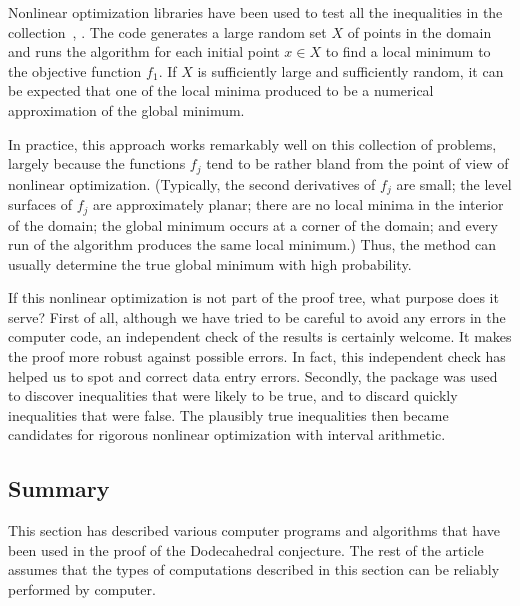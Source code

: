 \documentclass{article} %
\begin{document}
Nonlinear optimization libraries have been used to test
all the inequalities in the collection~\cite{Lawrence:1997:CFSQP},
\cite{Byrd:2006:LSNO}. 
The code generates a large random set
$X$ of points in the domain and runs the algorithm for each initial
point $x\in X$ to find a local minimum to the objective function
$f_1$. If $X$ is sufficiently large and sufficiently random, it can be
expected that one of the local minima produced to be a numerical
approximation of the global minimum.

In practice, this approach works remarkably well on this
collection of problems, largely because the functions $f_j$
tend to be rather bland from the point of view of nonlinear
optimization.  (Typically, the second derivatives of $f_j$
are small; the level surfaces of $f_j$ are approximately planar;
there are no local minima in the interior of the domain;
the global minimum occurs at a corner of the domain; and
every run of the algorithm produces the same local minimum.)
Thus, the method can usually determine the true global minimum with
high probability.

If this nonlinear optimization is not part of the proof tree, what
purpose does it serve? First of all, although we have tried to be
careful to avoid any errors in the computer code, an independent check
of the results is certainly welcome. It makes the proof more robust
against possible errors. In fact, this independent check has helped us
to spot and correct data entry errors. Secondly, the package was used
to discover inequalities that were likely to be true, and to discard
quickly inequalities that were false. The plausibly true inequalities
then became candidates for rigorous nonlinear optimization with
interval arithmetic.


\subsection{Summary}

This section has described various computer programs and algorithms
that have been used in the proof of the Dodecahedral conjecture. The
rest of the article assumes that the types of computations described
in this section can be reliably performed by computer.
\end{document}
